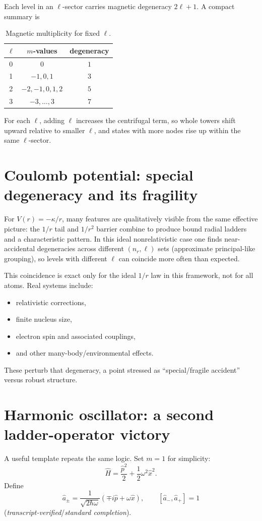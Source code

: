 Each level in an \(\ell\)-sector carries magnetic degeneracy \(2\ell+1\). A compact summary is
\begin{table}[h]
\centering
\begin{tabular}{c c c}
\hline
\(\ell\) & \(m\)-values & degeneracy \\
\hline
0 & \(0\) & \(1\) \\
1 & \(-1,0,1\) & \(3\) \\
2 & \(-2,-1,0,1,2\) & \(5\) \\
3 & \(-3,\dots,3\) & \(7\) \\
\hline
\end{tabular}
\caption{Magnetic multiplicity for fixed \(\ell\).}
\end{table}

For each \(\ell\), adding \(\ell\) increases the centrifugal term, so whole towers shift upward relative to smaller \(\ell\), and states with more nodes rise up within the same \(\ell\)-sector.

\section{Coulomb potential: special degeneracy and its fragility}
For \(V(r)=-\kappa/r\), many features are qualitatively visible from the same effective picture: the \(1/r\) tail and \(1/r^2\) barrier combine to produce bound radial ladders and a characteristic pattern. In this ideal nonrelativistic case one finds near-accidental degeneracies across different \((n_r,\ell)\) sets (approximate principal-like grouping), so levels with different \(\ell\) can coincide more often than expected.

This coincidence is exact only for the ideal \(1/r\) law in this framework, not for all atoms. Real systems include:
\begin{itemize}
\item relativistic corrections,
\item finite nucleus size,
\item electron spin and associated couplings,
\item and other many-body/environmental effects.
\end{itemize}
These perturb that degeneracy, a point stressed as “special/fragile accident” versus robust structure.

\section{Harmonic oscillator: a second ladder-operator victory}
A useful template repeats the same logic. Set \(m=1\) for simplicity:
\[
\hat H=\frac{\hat p^2}{2}+\frac{1}{2}\omega^2\hat x^2.
\]
Define
\[
\hat a_\pm=\frac{1}{\sqrt{2\hbar\omega}}\left(\mp i\hat p + \omega \hat x\right),
\qquad
[\hat a_-,\hat a_+]=1
\]
(\textit{transcript-verified}/\textit{standard completion}).

